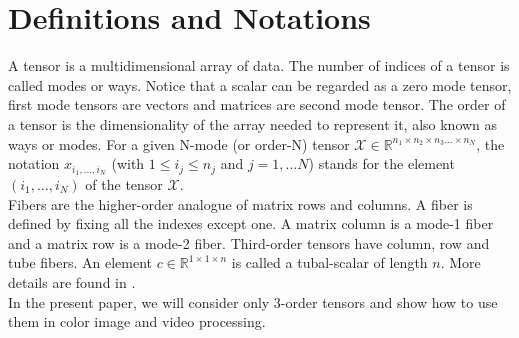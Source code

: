 \documentclass{siamltex}
\newcommand{\1}{\mathbb{1}}
\newcommand{\0}{\mathbb{0}}
\begin{document}
	\section{Definitions and Notations} A tensor is  a multidimensional array of data. The number of indices of a tensor is called modes or ways. 
	Notice that a scalar can be regarded as a zero mode tensor, first mode tensors are vectors and matrices are second mode tensor. The order of a tensor is the dimensionality of the array needed to represent it, also known as
	ways or modes. 
	For a given N-mode (or order-N) tensor $ \mathscr {X}\in \mathbb{R}^{n_{1}\times n_{2}\times n_{3}\ldots \times n_{N}}$, the notation $x_{i_{1},\ldots,i_{N}}$ (with $1\leq i_{j}\leq n_{j}$ and $ j=1,\ldots N $) stands for the element $\left(i_{1},\ldots,i_{N} \right) $ of the tensor $\mathscr {X}$.  \\  Fibers are the higher-order analogue of matrix rows and columns. A fiber is
	defined by fixing all the indexes  except  one. A matrix column is a mode-1 fiber and a matrix row is a mode-2 fiber. Third-order tensors have column, row and tube fibers. An element $c\in \mathbb{R}^{1\times 1 \times n}$ is called a tubal-scalar of length $n$. More details are found in  \cite{kimler1,kolda1}.  \\ In the present paper, we will consider only 3-order tensors and show how to use them in color image and video processing.
	
\end{document}
